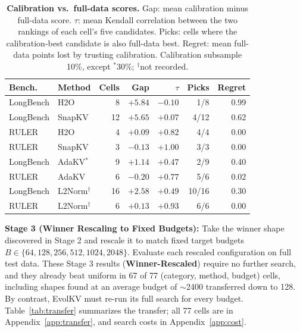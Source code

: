 \documentclass[11pt]{article}
\begin{document}
\begin{table}[htbp]
  \centering
  \footnotesize
  \setlength{\tabcolsep}{2.5pt}
  \begin{tabular}{@{} l l r r r r r @{}}
    \toprule
    \textbf{Bench.} & \textbf{Method} & \textbf{Cells} & \textbf{Gap} & \textbf{$\tau$} & \textbf{Picks} & \textbf{Regret} \\
    \midrule
    \rowcolor{gray!10}
    LongBench & H2O    & 8  & $+5.84$ & $-0.10$ & 1/8  & 0.99 \\
    LongBench & SnapKV & 12 & $+5.65$ & $+0.07$ & 4/12 & 0.62 \\
    \rowcolor{gray!10}
    RULER     & H2O    & 4  & $+0.09$ & $+0.82$ & 4/4  & 0.00 \\
    RULER     & SnapKV & 3  & $-0.13$ & $+1.00$ & 3/3  & 0.00 \\
    \midrule
    \rowcolor{gray!10}
    LongBench & AdaKV$^\ast$ & 9 & $+1.14$ & $+0.47$ & 2/9 & 0.40 \\
    RULER     & AdaKV  & 6  & $-0.20$ & $+0.77$ & 5/6  & 0.02 \\
    \midrule
    \rowcolor{gray!10}
    LongBench & L2Norm$^\dagger$ & 16 & $+2.58$ & $+0.49$ & 10/16 & 0.30 \\
    RULER     & L2Norm$^\dagger$ & 6  & $+0.13$ & $+0.93$ & 6/6   & 0.00 \\
    \bottomrule
  \end{tabular}
  \caption{\textbf{Calibration vs.\ full-data scores.} Gap: mean calibration minus full-data score. $\tau$: mean Kendall correlation between the two rankings of each cell's five candidates. Picks: cells where the calibration-best candidate is also full-data best. Regret: mean full-data points lost by trusting calibration. Calibration subsample 10\%, except $^\ast$30\%; $^\dagger$not recorded.}
  \label{tab:calib}
\end{table}

\textbf{Stage 3 (Winner Rescaling to Fixed Budgets):} Take the winner shape discovered in Stage 2 and rescale it to match fixed target budgets $B \in \{64, 128, 256, 512, 1024, 2048\}$. Evaluate each rescaled configuration on full test data. These Stage 3 results (\textbf{Winner-Rescaled}) require no further search, and they already beat uniform in 67 of 77 (category, method, budget) cells, including shapes found at an average budget of $\sim$2400 transferred down to 128. By contrast, EvolKV must re-run its full search for every budget. Table~\ref{tab:transfer} summarizes the transfer; all 77 cells are in Appendix~\ref{app:transfer}, and search costs in Appendix~\ref{app:cost}.
\end{document}
